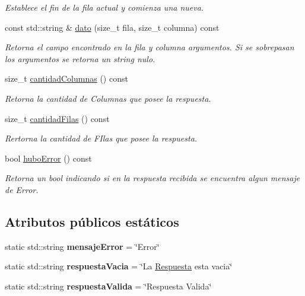 \begin{DoxyCompactItemize}
\begin{DoxyCompactList}\small\item\em \-Establece el fin de la fila actual y comienza una nueva. \end{DoxyCompactList}\item 
const std\-::string \& \hyperlink{classRespuesta_ae774da66d9ba0886f93d2534a5b6f143}{dato} (size\-\_\-t fila, size\-\_\-t columna) const 
\begin{DoxyCompactList}\small\item\em \-Retorna el campo encontrado en la fila y columna argumentos. \-Si se sobrepasan los argumentos se retorna un string nulo. \end{DoxyCompactList}\item 
size\-\_\-t \hyperlink{classRespuesta_ae786f9f4a9aa972132e5e32015543ab6}{cantidad\-Columnas} () const 
\begin{DoxyCompactList}\small\item\em \-Retorna la cantidad de \-Columnas que posee la respuesta. \end{DoxyCompactList}\item 
size\-\_\-t \hyperlink{classRespuesta_a9c7ba3983494e31fad1cb3d634130938}{cantidad\-Filas} () const 
\begin{DoxyCompactList}\small\item\em \-Rertorna la cantidad de \-F\-Ilas que posee la respuesta. \end{DoxyCompactList}\item 
bool \hyperlink{classRespuesta_a920555187de6a86754036ace66cf5213}{hubo\-Error} () const 
\begin{DoxyCompactList}\small\item\em \-Retorna un bool indicando si en la respuesta recibida se encuentra algun mensaje de \-Error. \end{DoxyCompactList}\end{DoxyCompactItemize}
\subsection*{\-Atributos públicos estáticos}
\begin{DoxyCompactItemize}
\item 
\hypertarget{classRespuesta_a26e78cca889e17fbbf0c2f6fb8508ffe}{static std\-::string {\bfseries mensaje\-Error} = \char`\"{}\-Error\char`\"{}}\label{classRespuesta_a26e78cca889e17fbbf0c2f6fb8508ffe}

\item 
\hypertarget{classRespuesta_aa4d00d6493a11c111c6be82f8fb49634}{static std\-::string {\bfseries respuesta\-Vacia} = \char`\"{}\-La \hyperlink{classRespuesta}{\-Respuesta} esta vacia\char`\"{}}\label{classRespuesta_aa4d00d6493a11c111c6be82f8fb49634}

\item 
\hypertarget{classRespuesta_a45b737918cc373661b16c5d42036df3b}{static std\-::string {\bfseries respuesta\-Valida} = \char`\"{}\-Respuesta \-Valida\char`\"{}}\label{classRespuesta_a45b737918cc373661b16c5d42036df3b}

\end{DoxyCompactItemize}


